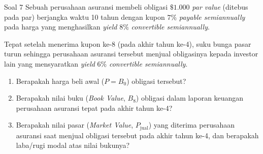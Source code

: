 \documentclass[11pt,a4paper]{article}
\begin{document}
\vspace{1.2em}

\begin{problembox}{Soal 7}
Sebuah perusahaan asuransi membeli obligasi $\$1.000$ \textit{par value} (ditebus pada par) berjangka waktu 10 tahun dengan kupon $7\%$ \textit{payable semiannually} pada harga yang menghasilkan \textit{yield} $8\%$ \textit{convertible semiannually}.

Tepat setelah menerima kupon ke-8 (pada akhir tahun ke-4), suku bunga pasar turun sehingga perusahaan asuransi tersebut menjual obligasinya kepada investor lain yang mensyaratkan \textit{yield} $6\%$ \textit{convertible semiannually}.
\begin{enumerate}[label=(\alph*)]
    \item Berapakah harga beli awal ($P = B_0$) obligasi tersebut?
    \item Berapakah nilai buku (\textit{Book Value}, $B_8$) obligasi dalam laporan keuangan perusahaan asuransi tepat pada akhir tahun ke-4?
    \item Berapakah nilai pasar (\textit{Market Value}, $P_{\text{jual}}$) yang diterima perusahaan asuransi saat menjual obligasi tersebut pada akhir tahun ke-4, dan berapakah laba/rugi modal atas nilai bukunya?
\end{enumerate}
\end{problembox}
\end{document}
